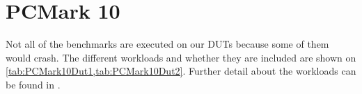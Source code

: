 \section{PCMark 10}
Not all of the benchmarks are executed on our DUTs because some of them would crash. The different workloads and whether they are included are shown on \cref{tab:PCMark10Dut1,tab:PCMark10Dut2}. Further detail about the workloads can be found in \cite{pcmark}.

